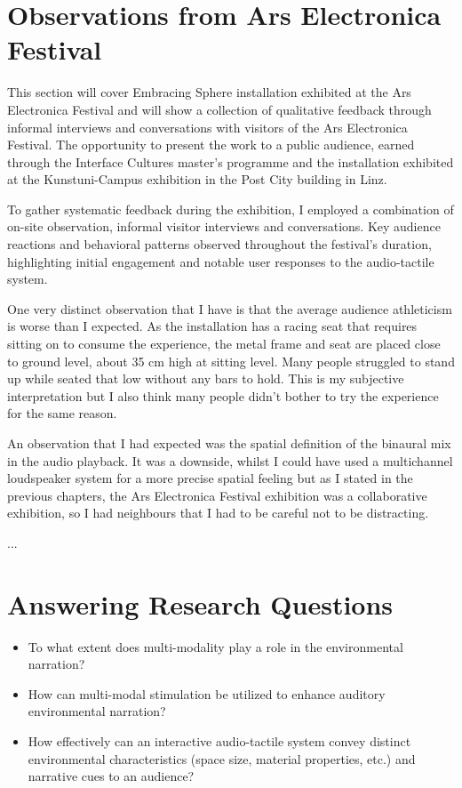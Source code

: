     \section{Observations from Ars Electronica Festival}
        This section will cover Embracing Sphere installation exhibited at the Ars Electronica Festival and will show a collection of qualitative feedback through informal interviews and conversations with visitors of the Ars Electronica Festival. The opportunity to present the work to a public audience, earned through the Interface Cultures master's programme and the installation exhibited at the Kunstuni-Campus exhibition in the Post City building in Linz.\par

        To gather systematic feedback during the exhibition, I employed a combination of on-site observation, informal visitor interviews and conversations. Key audience reactions and behavioral patterns observed throughout the festival’s duration, highlighting initial engagement and notable user responses to the audio-tactile system.\par

        One very distinct observation that I have is that the average audience athleticism is worse than I expected. As the installation has a racing seat that requires sitting on to consume the experience, the metal frame and seat are placed close to ground level, about 35 cm high at sitting level. Many people struggled to stand up while seated that low without any bars to hold. This is my subjective interpretation but I also think many people didn't bother to try the experience for the same reason.\par

        An observation that I had expected was the spatial definition of the binaural mix in the audio playback. It was a downside, whilst I could have used a multichannel loudspeaker system for a more precise spatial feeling but as I stated in the previous chapters, the Ars Electronica Festival exhibition was a collaborative exhibition, so I had neighbours that I had to be careful not to be distracting.\par

        ...\par
    \section{Answering Research Questions}
        \begin{itemize}
            \item To what extent does multi-modality play a role in the environmental narration?
            \item How can multi-modal stimulation be utilized to enhance auditory environmental narration?
            \item How effectively can an interactive audio-tactile system convey distinct environmental characteristics (space size, material properties, etc.) and narrative cues to an audience?
        \end{itemize}

